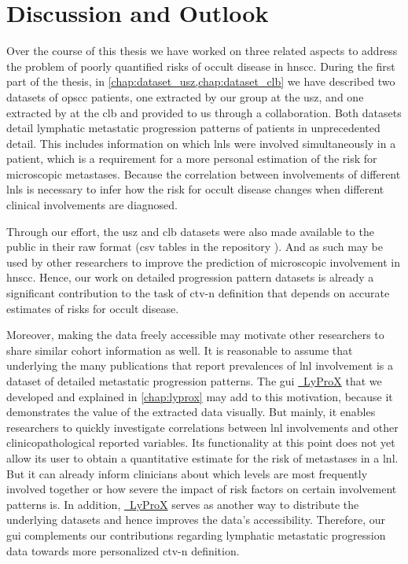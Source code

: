 \documentclass[\relativeRoot/main.tex]{subfiles}
\begin{document}
\chapter{Discussion and Outlook}
\label{chap:discussion}

Over the course of this thesis we have worked on three related aspects to address the problem of poorly quantified risks of occult disease in \gls{hnscc}. During the first part of the thesis, in \cref{chap:dataset_usz,chap:dataset_clb} we have described two datasets of \gls{opscc} patients, one extracted by our group at the \gls{usz}, and one extracted by  at the \gls{clb} and provided to us through a collaboration. Both datasets detail lymphatic metastatic progression patterns of patients in unprecedented detail. This includes information on which \glspl{lnl} were involved simultaneously in a patient, which is a requirement for a more personal estimation of the risk for microscopic metastases. Because the correlation between involvements of different \glspl{lnl} is necessary to infer how the risk for occult disease changes when different clinical involvements are diagnosed.

Through our effort, the \gls{usz} and \gls{clb} datasets were also made available to the public in their raw format (\acrshort{csv} tables in the repository ). And as such may be used by other researchers to improve the prediction of microscopic involvement in \gls{hnscc}. Hence, our work on detailed progression pattern datasets is already a significant contribution to the task of \gls{ctv-n} definition that depends on accurate estimates of risks for occult disease.

Moreover, making the data freely accessible may motivate other researchers to share similar cohort information as well. It is reasonable to assume that underlying the many publications that report prevalences of \gls{lnl} involvement \cite{candela_patterns_1990,shah_patterns_1990,woolgar_histological_1999,woolgar_topography_2007,chao_determination_2002,vauterin_patterns_2006,razfar_incidence_2009,ho_patterns_2012,bauwens_prevalence_2021} is a dataset of detailed metastatic progression patterns. The \gls{gui} \href{https://lyprox.org}{~LyProX} that we developed and explained in \cref{chap:lyprox} may add to this motivation, because it demonstrates the value of the extracted data visually. But mainly, it enables researchers to quickly investigate correlations between \gls{lnl} involvements and other clinicopathological reported variables. Its functionality at this point does not yet allow its user to obtain a quantitative estimate for the risk of metastases in a \gls{lnl}. But it can already inform clinicians about which levels are most frequently involved together or how severe the impact of risk factors on certain involvement patterns is. In addition, \href{https://lyprox.org}{~LyProX} serves as another way to distribute the underlying datasets and hence improves the data's accessibility. Therefore, our \gls{gui} complements our contributions regarding lymphatic metastatic progression data towards more personalized \gls{ctv-n} definition.
\end{document}
